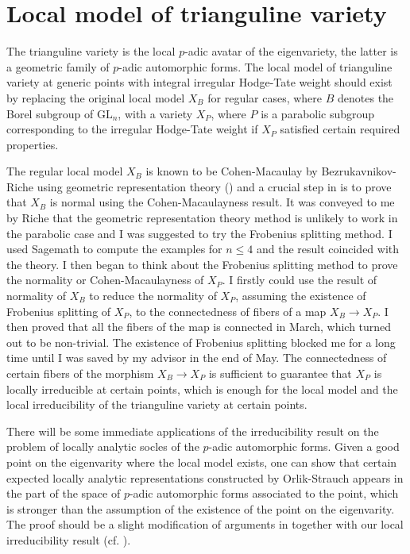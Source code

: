 \documentclass{amsart}
\newcommand{\GL}{\text{GL}}
\numberwithin{equation}{section}
\begin{document}
\section{Local model of trianguline variety}
The trianguline variety is the local $p$-adic avatar of the eigenvariety, the latter is a geometric family of $p$-adic automorphic forms. The local model of trianguline variety at generic points with integral irregular Hodge-Tate weight should exist by replacing the original local model $X_B$ for regular cases, where $B$ denotes the Borel subgroup of $\GL_n$, with a variety $X_P$, where $P$ is a parabolic subgroup corresponding to the irregular Hodge-Tate weight if $X_P$ satisfied certain required properties. \par
The regular local model $X_{B}$ is known to be Cohen-Macaulay by Bezrukavnikov-Riche using geometric representation theory (\cite{riche2008geometric}) and a crucial step in \cite{breuil2019local} is to prove that $X_B$ is normal using the Cohen-Macaulayness result. It was conveyed to me by Riche that the geometric representation theory method is unlikely to work in the parabolic case and I was suggested to try the Frobenius splitting method. I used Sagemath to compute the examples for $n\leq 4$ and the result coincided with the theory. I then began to think about the Frobenius splitting method to prove the normality or Cohen-Macaulayness of $X_P$. I firstly could use the result of normality of $X_B$ to reduce the normality of $X_P$, assuming the existence of Frobenius splitting of $X_P$, to the connectedness of fibers of a map $X_B\rightarrow X_P$. I then proved that all the fibers of the map is connected in March, which turned out to be non-trivial. The existence of Frobenius splitting blocked me for a long time until I was saved by my advisor in the end of May. The connectedness of certain fibers of the morphism $X_B\rightarrow X_P$ is sufficient to guarantee that $X_P$ is locally irreducible at certain points, which is enough for the local model and the local irreducibility of the trianguline variety at certain points.\par
There will be some immediate applications of the irreducibility result on the problem of locally analytic socles of the $p$-adic automorphic forms. Given a good point on the eigenvarity where the local model exists, one can show that certain expected locally analytic representations constructed by Orlik-Strauch appears in the part of the space of $p$-adic automorphic forms associated to the point, which is stronger than the assumption of the existence of the point on the eigenvarity. The proof should be a slight modification of arguments in \cite{breuil2019local} together with our local irreducibility result (cf. \cite{Wu2020unibranch}).\par
\end{document}
